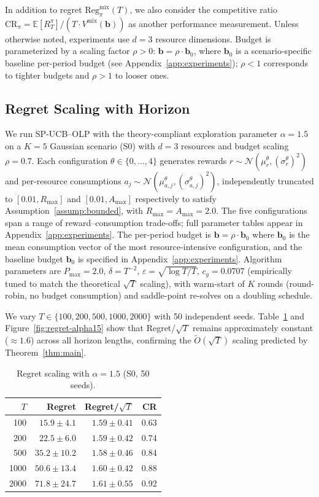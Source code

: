 \documentclass[11pt]{article}
\newcommand{\bb}{\mathbf{b}}
\begin{document}
\quad In addition to regret $\mathrm{Reg}_{\pi}^{\mathrm{mix}}(T)$, we also consider the competitive ratio $\mathrm{CR}_{\pi} = \mathbb{E}[R_T^{\pi}] / (T \cdot V^{\mathrm{mix}}(\bb))$ as another performance measurement. Unless otherwise noted, experiments use $d=3$ resource dimensions. Budget is parameterized by a scaling factor $\rho > 0$: $\bb = \rho \cdot \bb_0$, where $\bb_0$ is a scenario-specific baseline per-period budget (see Appendix~\ref{app:experiments}); $\rho < 1$ corresponds to tighter budgets and $\rho > 1$ to looser ones. 

\subsection{Regret Scaling with Horizon}
\label{sec:theory-validation}

We run SP-UCB--OLP with the theory-compliant exploration parameter $\alpha = 1.5$ on a $K=5$ Gaussian scenario (S0) with $d=3$ resources and budget scaling $\rho = 0.7$. Each configuration $\theta \in \{0,\ldots,4\}$ generates rewards $r \sim \mathcal{N}(\mu_r^\theta, (\sigma_r^\theta)^2)$ and per-resource consumptions $a_j \sim \mathcal{N}(\mu_{a,j}^\theta, (\sigma_{a,j}^\theta)^2)$, independently truncated to $[0.01, R_{\max}]$ and $[0.01, A_{\max}]$ respectively to satisfy Assumption~\ref{assump:bounded}, with $R_{\max} = A_{\max} = 2.0$. The five configurations span a range of reward--consumption trade-offs; full parameter tables appear in Appendix~\ref{app:experiments}. The per-period budget is $\bb = \rho \cdot \bb_0$ where $\bb_0$ is the mean consumption vector of the most resource-intensive configuration, and the baseline budget $\bb_0$ is specified in Appendix~\ref{app:experiments}. Algorithm parameters are $P_{\max} = 2.0$, $\delta = T^{-2}$, $\varepsilon = \sqrt{\log T / T}$, $c_g = 0.0707$ (empirically tuned to match the theoretical $\sqrt{T}$ scaling), with warm-start of $K$ rounds (round-robin, no budget consumption) and saddle-point re-solves on a doubling schedule.

We vary $T \in \{100, 200, 500, 1000, 2000\}$ with 50 independent seeds. Table~\ref{tab:regret-alpha15} and Figure~\ref{fig:regret-alpha15} show that Regret/$\sqrt{T}$ remains approximately constant ($\approx 1.6$) across all horizon lengths, confirming the $\tilde{O}(\sqrt{T})$ scaling predicted by Theorem~\ref{thm:main}.

\begin{table}[t]
\centering
\small
\caption{Regret scaling with $\alpha = 1.5$ (S0, 50 seeds).}
\label{tab:regret-alpha15}
\begin{tabular}{rrrr}
\toprule
$T$ & Regret & Regret/$\sqrt{T}$ & CR \\
\midrule
100 & $15.9 \pm 4.1$ & $1.59 \pm 0.41$ & 0.63 \\
200 & $22.5 \pm 6.0$ & $1.59 \pm 0.42$ & 0.74 \\
500 & $35.2 \pm 10.2$ & $1.58 \pm 0.46$ & 0.84 \\
1000 & $50.6 \pm 13.4$ & $1.60 \pm 0.42$ & 0.88 \\
2000 & $71.8 \pm 24.7$ & $1.61 \pm 0.55$ & 0.92 \\
\bottomrule
\end{tabular}
\end{table}
\end{document}
